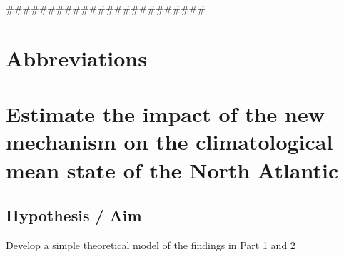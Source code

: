 


########################

\section{Abbreviations}




\newpage




\section{Estimate the impact of the new mechanism on the climatological mean state of the North Atlantic}

\subsection{ Hypothesis / Aim}
Develop a simple theoretical model of the findings in Part 1 and 2







